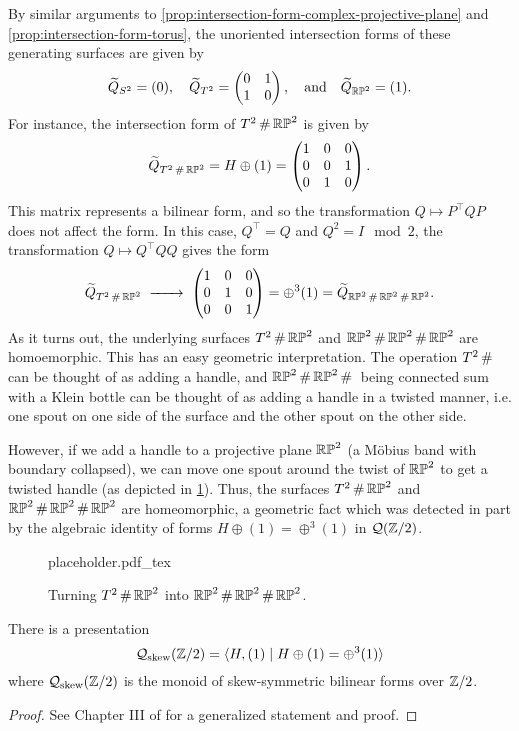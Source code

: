 By similar arguments to \cref{prop:intersection-form-complex-projective-plane} and \cref{prop:intersection-form-torus}, the unoriented intersection forms of these generating surfaces are given by
\[
	\widetilde{Q}_{S^2}=(0),\quad \widetilde{Q}_{T^2}=\begin{pmatrix}0 & 1 \\ 1 & 0\end{pmatrix},\quad \textrm{and}\quad\widetilde{Q}_{\mathbb{RP}^2} = (1).
\]
For instance, the intersection form of $T^2\+ \RP^2$ is given by
\[
	\widetilde{Q}_{T^2\+ \RP^2} = H\oplus (1)=
	\begin{pmatrix}
		1 & 0 & 0 \\
		0 & 0 & 1 \\
		0 & 1 & 0
	\end{pmatrix}.
\]
This matrix represents a bilinear form, and so the transformation $Q\mapsto P^\intercal Q P$ does not affect the form. In this case, $Q^\intercal =Q$ and $Q^2=I\mod 2$, the transformation $Q\mapsto Q^\intercal Q Q$ gives the form
\[
	\widetilde{Q}_{T^2\+ \RP^2}
	\lkxto \begin{pmatrix}
		1 & 0 & 0 \\
		0 & 1 & 0 \\
		0 & 0 & 1
	\end{pmatrix} =\oplus^3(1)= \widetilde{Q}_{\RP^2\+\RP^2\+\RP^2}.
\]
As it turns out, the underlying surfaces $T^2\+\RP^2$ and $\RP^2\+\RP^2\+\RP^2$ are homoemorphic. This has an easy geometric interpretation. The operation $T^2\+$ can be thought of as adding a handle, and $\RP^2\+\RP^2\+$ being connected sum with a Klein bottle can be thought of as adding a handle in a twisted manner, i.e. one spout on one side of the surface and the other spout on the other side.

However, if we add a handle to a projective plane $\mathbb{RP}^2$ (a M\"obius band with boundary collapsed), we can move one spout around the twist of $\mathbb{RP}^2$ to get a twisted handle (as depicted in \cref{fig:twisted-handle-to-handle}). Thus, the surfaces $T^2\+\RP^2$ and $\RP^2\+\RP^2\+\RP^2$ are homeomorphic, a geometric fact which was detected in part by the algebraic identity of forms $H\oplus (1)=\oplus^3(1)$ in $\mathcal{Q}(\mathbb{Z}/2)$.

\begin{figure}[ht]
	\centering
	{placeholder.pdf_tex}
	\caption{Turning $T^2\+\RP^2$ into $\RP^2\+\RP^2\+\RP^2$.}\label{fig:twisted-handle-to-handle}
\end{figure}

\begin{proposition}
	There is a presentation
	\[\mathcal{Q}_{\mathrm{skew}}(\mathbb{Z}/2) = \langle H, (1) \mid H\oplus (1) = \oplus^3 (1)\rangle\]
	where $\mathcal{Q}_{\mathrm{skew}}(\mathbb{Z}/2)$ is the monoid of skew-symmetric bilinear forms over $\mathbb{Z}/2$.
\end{proposition}
\begin{proof}
	See Chapter III of \cite{milnorhuse1973forms} for a generalized statement and proof.
\end{proof}

